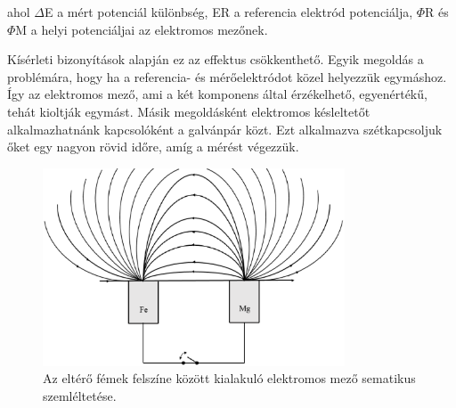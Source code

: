 ahol $\Delta$E a mért potenciál különbség, ER a referencia elektród potenciálja, $\Phi$R és $\Phi$M a helyi potenciáljai az elektromos mezőnek. 

Kísérleti bizonyítások alapján ez az effektus csökkenthető. Egyik megoldás a problémára, hogy ha a referencia- és mérőelektródot közel helyezzük egymáshoz. Így az elektromos mező, ami a két komponens által érzékelhető, egyenértékű, tehát kioltják egymást. Másik megoldásként elektromos késleltetőt alkalmazhatnánk kapcsolóként a galvánpár közt. Ezt alkalmazva szétkapcsoljuk őket egy nagyon rövid időre, amíg a mérést végezzük.

\begin{figure}
\centering
\includegraphics[width=0.8\textwidth]{img/field.eps}
\caption{Az eltérő fémek felszíne között kialakuló elektromos mező sematikus szemléltetése.}
\label{fig:field}
\end{figure}

